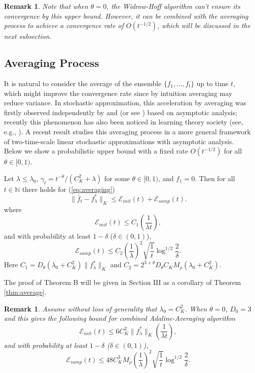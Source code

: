 \documentclass[twoside,twocolumn,journal]{IEEEtran}
\newtheorem{rem}[thm]{Remark}
\newenvironment{mainthm}[1][Main Theorem]{\medskip \noindent {\bf #1.}\begin{em}}{\end{em}\medskip}
\def\N{{\mathbb N}}
\def\Err{{\mathscr E}}
\begin{document}
\medskip

\begin{rem}
Note that when $\theta=0$, the \emph{Widrow-Hoff} algorithm \cite{WidHof60} can't ensure its convergence by this upper bound.
However, it can be combined with the averaging process to achieve a convergence rate of $O(t^{-1/2})$,
which will be discussed in the next subsection.
\end{rem}

\subsection{Averaging Process}
It is natural to consider the average of the ensemble
$\{f_1,\ldots,f_t\}$ up to time $t$, which might improve the
convergence rate since by intuition averaging may reduce variance.
In stochastic approximation, this acceleration by averaging was
firstly observed independently by \cite{Ruppert88} and
\cite{Polyak90} (or see \cite{PolJud92}) based on
asymptotic analysis; recently this phenomenon has also been
noticed in learning theory society (see, e.g.,
\cite{CesConGen04}). A recent result \cite{KonTsi04} studies
this averaging process in a more general framework of
two-time-scale linear stochastic approximations with asymptotic analysis. Below we show
a probabilistic upper bound with a fixed rate $O(t^{-1/2})$ for all $\theta\in [0,1)$.


%
%

\begin{mainthm}[Theorem B]
Let $\lambda\leq \lambda_0$, $\gamma_t = t^{-\theta}/(C^2_K + \lambda)$ for some $\theta\in [0,1)$, and $f_1=0$.
Then for all $t\in \N$ there holds for (\ref{eq:averaging})
\[ \| \bar{f}_t - f^\ast_\lambda \|_K \leq \Err_{init}(t) + \Err_{samp}(t). \]
where
\[ \Err_{init}(t)\leq  C_1 \left( \frac{1}{\lambda t} \right), \]
and with probability at least $1-\delta$ ($\delta\in (0,1)$),
\[ \Err_{samp}(t) \leq C_2 \left(\frac{1}{\lambda} \right)^2 \sqrt{\frac{1}{t}} \log^{1/2}\frac{2}{\delta}. \]
Here $C_1=D_\theta(\lambda_0+C^2_K) \|f^\ast_\lambda\|_K$ and $C_2=2^{3+\theta} D_\theta C_K M_\rho(\lambda_0+C^2_K)$.
\end{mainthm}

The proof of Theorem B will be given in Section III as a corollary of Theorem \ref{thm:average}.

\medskip

\begin{rem} Assume without loss of generality that $\lambda_0=C^2_K$. When $\theta=0$, $D_0=3$ and this gives the following bound
for combined \emph{Adaline-Averaging} algorithm
\[ \Err_{init}(t)\leq  6C^2_K \|f^\ast_\lambda\|_K \left( \frac{1}{\lambda t} \right),\]
and with probability at least $1-\delta$ ($\delta\in (0,1)$),
\[ \Err_{samp}(t) \leq 48 C^3_K M_\rho \left(\frac{1}{\lambda} \right)^2 \sqrt{\frac{1}{t}} \log^{1/2}\frac{2}{\delta}. \]
\end{rem}
\end{document}
